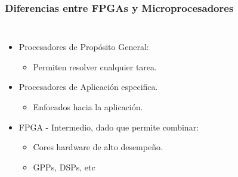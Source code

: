 \frame
{
	\frametitle{Diferencias entre FPGAs y Microprocesadores} 
  \begin{columns}
  
\begin{itemize}
	\item Procesadores de Prop\'osito General: 	%
	\begin{itemize}
		\item Permiten resolver cualquier tarea. %
	\end{itemize}
	\item Procesadores de Aplicaci\'on especifica. %
	\begin{itemize}
		\item Enfocados hacia la aplicaci\'on. %
	\end{itemize} 
	\item FPGA - Intermedio, dado que permite combinar:	%
		\begin{itemize}
			\item Cores hardware de alto desempe\~no. %
			\item GPPs, DSPs, etc %
		\end{itemize}
	
\end{itemize}
  \begin{center}
		\begin{figure}      
		 \end{figure}	
		 \end{center}
		\end{columns}
  
}

